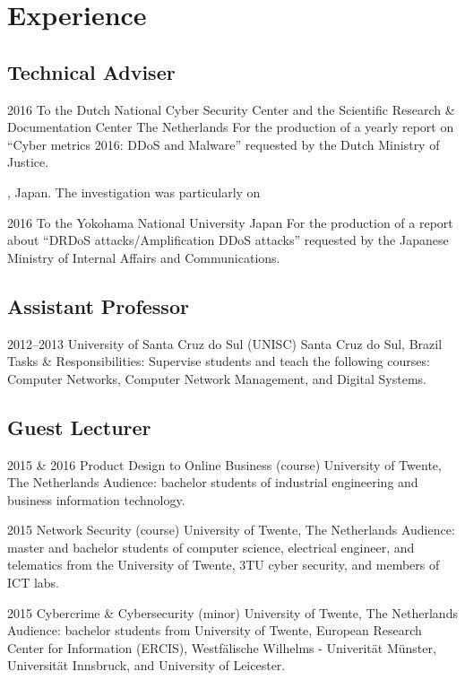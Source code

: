 \documentclass[print]{friggeri-cv} %
\begin{document}
\vspace{-0.7cm}
\section{Experience}

\subsection{Technical Adviser}
\begin{entrylist}
\entry
{2016}
{To the Dutch National Cyber Security Center and the Scientific Research \& Documentation Center}
{The Netherlands}
{For the production of a yearly report on ``Cyber metrics 2016: DDoS and Malware'' requested by the Dutch Ministry of Justice.}

, Japan. The investigation was particularly on 

\entry
{2016}
{To the Yokohama National University}
{Japan}
{For the production of a report about ``DRDoS attacks/Amplification DDoS attacks'' requested by the Japanese Ministry of Internal Affairs and Communications.}
\end{entrylist}

\subsection{Assistant Professor}
\begin{entrylist}
\entry
{2012--2013}
{University of Santa Cruz do Sul (UNISC)}
{Santa Cruz do Sul, Brazil}
{Tasks \& Responsibilities: Supervise students and teach the following courses: Computer Networks, Computer Network Management, and Digital Systems.}
\end{entrylist}

\subsection{Guest Lecturer}
\begin{entrylist}
\entry
{2015 \& 2016}
{Product Design to Online Business (course)}
{University of Twente, The Netherlands}
{Audience: bachelor students of industrial engineering and business information technology.}

\entry
{2015}
{Network Security (course)}
{University of Twente, The Netherlands}
{Audience: master and bachelor students of computer science, electrical engineer, and telematics from the University of Twente, 3TU cyber security, and members of ICT labs. }

\entry
{2015}
{Cybercrime \& Cybersecurity (minor)}
{University of Twente, The Netherlands}
{Audience: bachelor students from University of Twente, European Research Center for Information (ERCIS), Westfälische Wilhelms - Univerität Münster, Universität Innsbruck, and University of Leicester. }
\end{entrylist}
\end{document}
